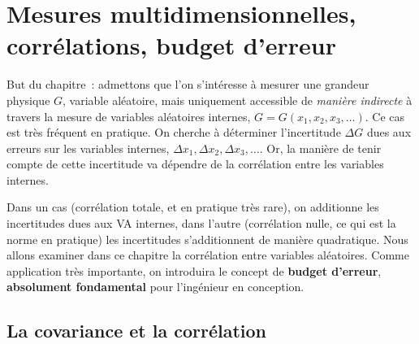 
\chapter{Mesures multidimensionnelles, corrélations, budget d'erreur}

But du chapitre~: admettons que l'on s'intéresse à mesurer une grandeur physique $G$, variable aléatoire, mais uniquement accessible de \textit{manière indirecte} à travers la mesure de variables aléatoires internes, $G=G(x_1,x_2,x_3,\dots)$. Ce cas est très fréquent en pratique. On cherche à déterminer l'incertitude $\Delta G$ dues aux erreurs sur les variables internes, $\Delta x_1,\Delta x_2,\Delta x_3,\dots$. Or, la manière de tenir compte de cette incertitude va dépendre de la corrélation entre les variables internes.

Dans un cas (corrélation totale, et en pratique très rare), on additionne les incertitudes dues aux VA internes, dans l'autre (corrélation nulle, ce qui est la norme en pratique) les incertitudes s'additionnent de manière quadratique. Nous allons examiner dans ce chapitre la corrélation entre variables aléatoires. Comme application très importante, on introduira le concept de \textbf{budget d'erreur}, \textbf{absolument fondamental} pour l'ingénieur en conception.

\section{La covariance et la corrélation}

